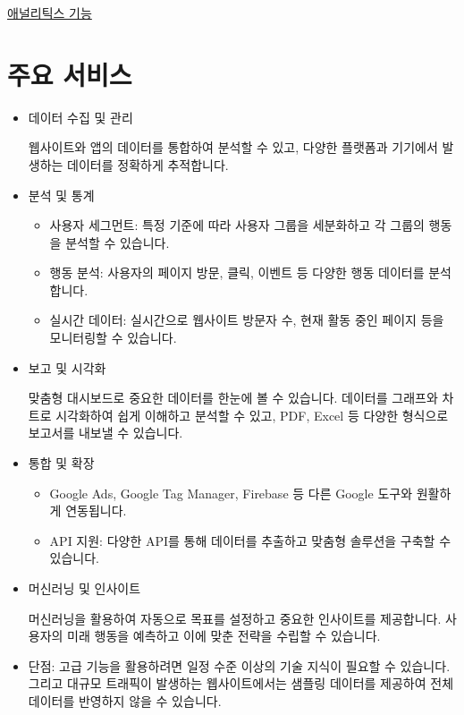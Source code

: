 \documentclass[
  letterpaper,
]{book}
\providecommand{\tightlist}{%
  \setlength{\itemsep}{0pt}\setlength{\parskip}{0pt}}\usepackage{longtable,booktabs,array}
\begin{document}
\href{https://marketingplatform.google.com/intl/ko/about/analytics/features/}{애널리틱스
기능}

\section{주요 서비스}\label{uxc8fcuxc694-uxc11cuxbe44uxc2a4}

\begin{itemize}
\item
  데이터 수집 및 관리

  웹사이트와 앱의 데이터를 통합하여 분석할 수 있고, 다양한 플랫폼과
  기기에서 발생하는 데이터를 정확하게 추적합니다.
\item
  분석 및 통계

  \begin{itemize}
  \tightlist
  \item
    사용자 세그먼트: 특정 기준에 따라 사용자 그룹을 세분화하고 각 그룹의
    행동을 분석할 수 있습니다.
  \item
    행동 분석: 사용자의 페이지 방문, 클릭, 이벤트 등 다양한 행동
    데이터를 분석합니다.
  \item
    실시간 데이터: 실시간으로 웹사이트 방문자 수, 현재 활동 중인 페이지
    등을 모니터링할 수 있습니다.
  \end{itemize}
\item
  보고 및 시각화

  맞춤형 대시보드로 중요한 데이터를 한눈에 볼 수 있습니다. 데이터를
  그래프와 차트로 시각화하여 쉽게 이해하고 분석할 수 있고, PDF, Excel 등
  다양한 형식으로 보고서를 내보낼 수 있습니다.
\item
  통합 및 확장

  \begin{itemize}
  \tightlist
  \item
    Google Ads, Google Tag Manager, Firebase 등 다른 Google 도구와
    원활하게 연동됩니다.
  \item
    API 지원: 다양한 API를 통해 데이터를 추출하고 맞춤형 솔루션을 구축할
    수 있습니다.
  \end{itemize}
\item
  머신러닝 및 인사이트

  머신러닝을 활용하여 자동으로 목표를 설정하고 중요한 인사이트를
  제공합니다. 사용자의 미래 행동을 예측하고 이에 맞춘 전략을 수립할 수
  있습니다.
\item
  단점: 고급 기능을 활용하려면 일정 수준 이상의 기술 지식이 필요할 수
  있습니다. 그리고 대규모 트래픽이 발생하는 웹사이트에서는 샘플링
  데이터를 제공하여 전체 데이터를 반영하지 않을 수 있습니다.


\end{itemize}
\end{document}
